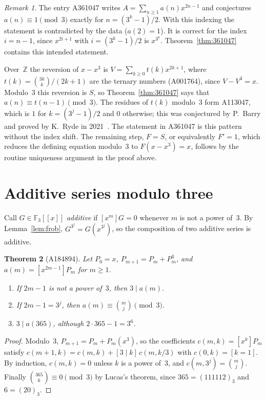 \documentclass[11pt]{article}
\newtheorem{theorem}{Theorem}
\theoremstyle{remark}
\newtheorem{remark}[theorem]{Remark}
\newcommand{\F}{\mathbb F}
\newcommand{\Z}{\mathbb Z}
\begin{document}
\begin{remark}\label{rem:361047}
The entry A361047 writes $A=\sum_{n\ge1}a(n)x^{2n-1}$ and conjectures
$a(n)\equiv1\pmod3$ exactly for $n=(3^k-1)/2$. With this indexing the
statement is contradicted by the data ($a(2)=1$). It is correct for the
index $i=n-1$, since $x^{2i+1}$ with $i=(3^k-1)/2$ is $x^{3^k}$.
Theorem~\ref{thm:361047} contains this intended statement.

Over~$\Z$ the reversion of $x-x^3$ is $V=\sum_{k\ge0}t(k)x^{2k+1}$, where
$t(k)=\binom{3k}{k}/(2k+1)$ are the ternary numbers (A001764), since
$V-V^3=x$. Modulo~$3$ this reversion is $S$, so Theorem~\ref{thm:361047} says
that $a(n)\equiv t(n-1)\pmod3$. The residues of $t(k)$ modulo~$3$ form
A113047, which is $1$ for $k=(3^j-1)/2$ and $0$ otherwise; this was
conjectured by P.~Barry and proved by K.~Ryde in 2021~\cite{ryde}. The
statement in A361047 is this pattern without the index shift. The remaining
step, $F=S$, or equivalently $F'=1$, which reduces the defining equation
modulo~$3$ to $F(x-x^3)=x$, follows by the routine uniqueness argument in the
proof above.
\end{remark}

\section{Additive series modulo three}\label{sec:additive}
Call $G\in\F_3[[x]]$ \emph{additive} if $[x^m]G=0$ whenever $m$ is not a
power of~$3$. By Lemma~\ref{lem:frob}, $G^{3^j}=G(x^{3^j})$, so the
composition of two additive series is additive.

\begin{theorem}[A184894]\label{thm:184894}
Let $P_0=x$, $P_{m+1}=P_m+P_m^3$, and $a(m)=[x^{2m-1}]P_m$ for $m\ge1$.
\begin{enumerate}
\item If $2m-1$ is not a power of~$3$, then $3\mid a(m)$.
\item If $2m-1=3^j$, then $a(m)\equiv\binom mj\pmod3$.
\item $3\mid a(365)$, although $2\cdot365-1=3^6$.
\end{enumerate}
\end{theorem}
\begin{proof}
Modulo~$3$, $P_{m+1}=P_m+P_m(x^3)$, so the coefficients $c(m,k)=[x^k]P_m$
satisfy $c(m+1,k)=c(m,k)+[3\mid k]\,c(m,k/3)$ with $c(0,k)=[k=1]$. By
induction, $c(m,k)=0$ unless $k$ is a power of~$3$, and
$c(m,3^j)=\binom mj$. Finally $\binom{365}{6}\equiv0\pmod3$ by Lucas's
theorem, since $365=(111112)_3$ and $6=(20)_3$.
\end{proof}
\end{document}
